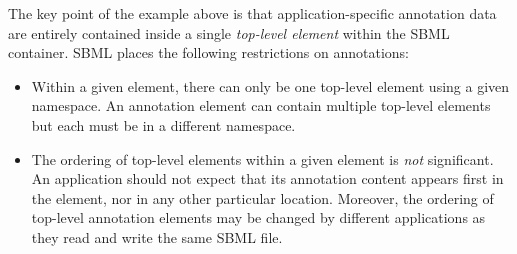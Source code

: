 The key point of the example above is that application-specific
annotation data are entirely contained inside a single
\emph{top-level element} within the SBML 
container.  SBML \thisLVnum places the following
restrictions on annotations:
\begin{itemize}

\item Within a given  element, there can
  only be one top-level element using a given namespace.  An
  annotation element can contain multiple top-level elements but
  each must be in a different namespace.

  
\item The ordering of top-level elements within a given
   element is \emph{not} significant.  An
  application should not expect that its annotation content
  appears first in the  element, nor in any
  other particular location.  Moreover, the ordering of
    top-level annotation elements may be changed by
  different applications as they read and write the same
    SBML file.

\end{itemize}

